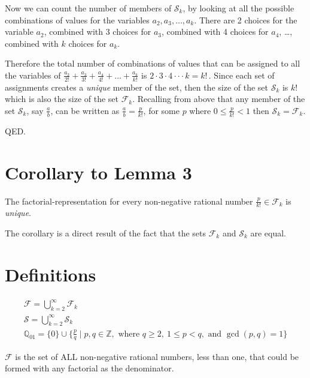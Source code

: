 \documentclass{article}
\begin{document}
Now we can count the number of members of \(\mathcal{S}_k\), by looking at all the
possible combinations of values for the variables \(a_2, a_3, \dots{}, a_k\).
There are 2 choices for the variable \(a_2\),
combined with 3 choices for \(a_3\),
combined with 4 choices for \(a_4\),
\dots{},
combined with \(k\) choices for \(a_k\).

Therefore the total number of combinations of values
that can be assigned to all the variables of
\(\frac{a_2}{2!}
+ \frac{a_3}{3!}
+ \frac{a_4}{4!}
+ \dots{} + \frac{a_k}{k!}\)
is \(2\cdot{}3\cdot{}4\cdot\cdot{}\cdot{}k = k!\,\). Since each set of assignments 
creates a \emph{unique} member of the set, then the size of the set \(\mathcal{S}_k\) is \(k!\)
which is also the size of the set \(\mathcal{F}_k\).
Recalling from above that any 
member of the set \(\mathcal{S}_k\), say \(\frac{a}{b}\),
can be written as \(\frac{a}{b} = \frac{p}{k!}\), for some \(p\) where 
\(0\le{}\frac{p}{k!}<1\) then
\(\mathcal{S}_k = \mathcal{F}_k\).

QED.

\section*{Corollary to Lemma 3}

The factorial-representation for every non-negative rational number \(\frac{p}{k!} \in \mathcal{F}_k\) is 
\emph{unique}.

The corollary is a direct result of the fact that
the sets
\(\mathcal{F}_k\) and
\(\mathcal{S}_k\) are equal.

\section*{Definitions}

{\small
\begin{gather*}
\mathcal{F} = \bigcup\limits_{k=2}^{\infty} \mathcal{F}_k \\
\mathcal{S} = \bigcup\limits_{k=2}^{\infty} \mathcal{S}_k \\
\mathbb{Q}_{01} = \{0\} \cup \{\frac{p}{q} \mid p, q \in \mathbb{Z},\text{ where } q \ge{} 2,\ 1 \le{} p < q,
\text{ and } \gcd(p,q) = 1\}
\end{gather*}
}

\(\mathcal{F}\) is the set of ALL non-negative rational numbers, less than one, that could be
formed with any factorial as the denominator.
\end{document}

